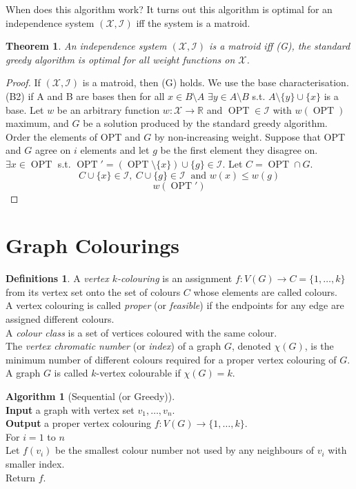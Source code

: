 \documentclass{article}
\newtheorem*{thm}{Theorem}
\theoremstyle{definition}
\newtheorem*{defns}{Definitions}
\newtheorem*{alg}{Algorithm}
\newcommand{\RR}{\mathbb{R}}
\newcommand{\X}{\mathcal{X}}
\newcommand{\I}{\mathcal{I}}
\DeclareMathOperator{\OPT}{OPT}
\begin{document}
When does this algorithm work?
It turns out this algorithm is optimal for an independence system $(\X,\I)$ iff the system is a matroid.

\begin{thm}
An independence system $(\X,\I)$ is a matroid iff (G), the standard greedy algorithm is optimal for all weight functions on $\X$.
\end{thm}

\begin{proof}
If $(\X,\I)$ is a matroid, then (G) holds.
We use the base characterisation.
(B2) if A and B are bases then for all $x\in B\setminus A$ $\exists y\in A\setminus B$ s.t. $A\setminus \{y\}\cup\{x\}$ is a base.
Let $w$ be an arbitrary function $w\colon \X \to \RR$ and $\OPT\in \I$ with $w(\OPT)$ maximum, and $G$ be a solution produced by the standard greedy algorithm.
Order the elements of OPT and $G$ by non-increasing weight.
Suppose that OPT and $G$ agree on $i$ elements and let $g$ be the first element they disagree on.
$\exists x \in \OPT$ s.t. $\OPT'=(\OPT \setminus \{x\}) \cup \{g\}\in\I$.
Let $C=\OPT\cap G$.
$$C\cup\{x\}\in \I,\ C\cup\{g\} \in \I\ \text{ and } w(x)\le w(g)$$
$$w(\OPT') $$
\end{proof}



\section{Graph Colourings}

\begin{defns}
A \emph{vertex $k$-colouring} is an assignment $f\colon V(G)\to C=\{1,\ldots,k\}$ from its vertex set onto the set of colours $C$ whose elements are called colours. \\
A vertex colouring is called \emph{proper} (or \emph{feasible}) if the endpoints for any edge are assigned different colours.\\
A \emph{colour class} is a set of vertices coloured with the same colour. \\
The \emph{vertex chromatic number} (or \emph{index}) of a graph $G$, denoted $\chi(G)$, is the minimum number of different colours required for a proper vertex colouring of $G$. \\
A graph $G$ is called $k$-vertex colourable if $\chi(G) = k$.
\end{defns}

\begin{alg}[Sequential (or Greedy)]~\\
\textbf{Input} a graph with vertex set $v_1,\ldots,v_n$. \\
\textbf{Output} a proper vertex colouring $f\colon V(G)\to \{1,\ldots,k\}$. \\
For $i = 1$ to $n$ \\
\indent Let $f(v_i)$ be the smallest colour number not used by any neighbours of $v_i$ with smaller index. \\
Return $f$.
\end{alg}
\end{document}
